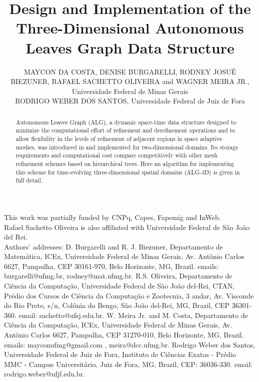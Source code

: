 \documentclass[acmtoms]{acmtrans2m}
\title{ Design and Implementation of the Three-Dimensional Autonomous Leaves Graph Data Structure}
\author
 {
     MAYCON DA COSTA, DENISE BURGARELLI,
     RODNEY JOSU\'E BIEZUNER, RAFAEL SACHETTO OLIVEIRA and WAGNER MEIRA
     JR., Universidade Federal de Minas Gerais \\
     RODRIGO WEBER DOS SANTOS, Universidade Federal de Juiz de Fora
 }
\begin{document}
        \begin{bottomstuff}
        This work was partially funded by CNPq, Capes, Fapemig and InWeb.\\
        Rafael Sachetto Oliveira is also affiliated with Universidade Federal de
        São João del Rei.\\
        Authors' addresses: D. Burgarelli and R. J. Biezuner,
        Departamento de Matem\'atica, ICEx, Universidade Federal de Minas  Gerais, Av. Ant\^onio Carlos 6627, Pampulha,
        CEP 30161-970, Belo Horizonte, MG, Brazil. emails: burgarelli@ufmg.br, rodney@mat.ufmg.br.
        R.S. Oliveira, Departamento de Ciência da Computação,
        Universidade Federal de São João del-Rei, CTAN,
        Prédio dos Cursos de Ciência da Computação e Zootecnia, 3 andar, Av. Visconde do Rio Preto,
        s/n, Colônia do Bengo, São João del-Rei, MG, Brazil, CEP 36301-360. email:
        sachetto@ufsj.edu.br. W. Meira Jr. and M. Costa, Departamento de Ci\^encia da Computa\c c\~ao, ICEx,
        Universidade Federal de Minas Gerais, Av. Ant\^onio Carlos 6627,
        Pampulha, CEP 31270-010, Belo Horizonte, MG, Brazil. emails:
        mayconufmg@gmail.com , meira@dcc.ufmg.br. Rodrigo Weber dos Santos,
        Universidade Federal de Juiz de Fora, Instituto de Ciências Exatas - Prédio
        MMC - Campus Universitário, Juiz de Fora, MG, Brazil, CEP: 36036-330.
        email: rodrigo.weber@ufjf.edu.br.
        \end{bottomstuff}

%

    \begin{abstract}
    Autonomous Leaves Graph (ALG), a dynamic space-time data
    structure designed to minimize the computational effort of refinement and
    derefinement operations and to allow flexibility in the levels of refinement
    of adjacent regions in space adaptive meshes, was introduced in
    \cite{Burgarelli1998} and implemented for two-dimensional domains. Its
    storage requirements and computational cost compare competitively with other
    mesh refinement schemes based on hierarchical trees. Here an algorithm for
    implementing this scheme for time-evolving three-dimensional spatial domains
    (ALG-3D) is given in full detail.
    \end{abstract}
\end{document}
